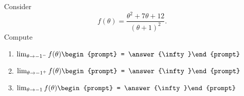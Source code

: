 \documentclass{ximera}
\author{Bart Snapp}
\begin{document}
\begin{exercise}
Consider 
\[
f(\theta) = \frac{\theta ^2+7 \theta +12}{(\theta +1)^2}.
\]
Compute
\begin{enumerate}
\item $\lim_{\theta\to -1^- } f(\theta) \begin{prompt} = \answer{\infty}\end{prompt}$
\item $\lim_{\theta\to -1^+ } f(\theta) \begin{prompt} = \answer{\infty}\end{prompt}$
\item $\lim_{\theta\to -1 } f(\theta) \begin{prompt} = \answer{\infty}\end{prompt}$
\end{enumerate}
\end{exercise}
\end{document}
